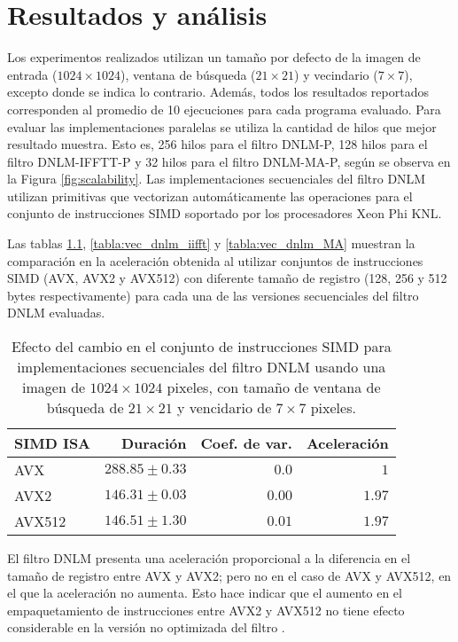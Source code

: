 \chapter{Resultados y análisis}
\label{ch:res}

Los experimentos realizados utilizan un tama\~no por defecto de la imagen de entrada ($1024 \times 1024$), ventana de búsqueda \Omega  ($21 \times 21$) y vecindario \omega ($7 \times 7$), excepto donde se indica lo contrario. Adem\'as, todos los resultados reportados corresponden al promedio de 10 ejecuciones para cada programa evaluado.  Para evaluar las implementaciones paralelas se utiliza la cantidad de hilos que mejor resultado muestra. Esto es, 256 hilos para el filtro DNLM-P, 128 hilos para el filtro DNLM-IFFTT-P y 32 hilos para el filtro DNLM-MA-P, según se observa en la Figura \ref{fig:scalability}. Las implementaciones secuenciales del filtro DNLM utilizan primitivas que vectorizan automáticamente las operaciones para el conjunto de instrucciones SIMD soportado por los procesadores Xeon Phi KNL.

Las tablas \ref{tabla:vec_dnlm}, \ref{tabla:vec_dnlm_iifft} y \ref{tabla:vec_dnlm_MA} muestran la comparación en la aceleración obtenida al utilizar conjuntos de instrucciones SIMD (AVX, AVX2 y AVX512) con diferente tama\~no de registro (128, 256 y 512 bytes respectivamente) para cada una de las versiones secuenciales del filtro DNLM evaluadas. 


\begin{table}
\protect\caption[Efecto de vectorización con instrucciones SIMD para el filtro DNLM]{Efecto del cambio en el conjunto de instrucciones SIMD para implementaciones secuenciales del filtro DNLM usando una imagen de  $1024 \times 1024$ pixeles, con tama\~no de ventana de búsqueda de $21 \times 21$ y vencidario de $7 \times 7$ pixeles. \label{tabla:vec_dnlm}}
\centering
\begin{tabular}{lrrr}
SIMD ISA & Duración \left[s\right]& Coef. de var. & Aceleración \left[x\right] \tabularnewline
\hline
AVX & $288.85\pm0.33$ & $0.0$ & $1$\tabularnewline
AVX2 & $146.31\pm0.03$ & $0.00$ & $1.97$\tabularnewline
AVX512 & $146.51\pm 1.30$ & $0.01$ & $1.97$ \tabularnewline
\end{tabular}
\end{table}

El filtro DNLM presenta una aceleración proporcional a la diferencia en el tama\~no de registro entre AVX y AVX2; pero no en el caso de AVX y AVX512, en el que la aceleración no aumenta. Esto hace indicar que el aumento en el empaquetamiento de instrucciones entre AVX2 y AVX512 no tiene efecto considerable en la versión no optimizada del filtro . 



